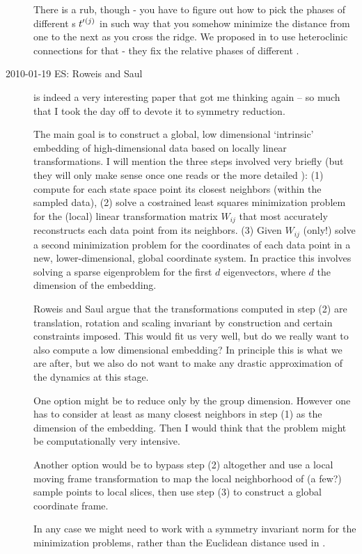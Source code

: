 \begin{description}
There is a rub, though - you have to figure out how to pick the phases of
different \template s $t'_{}{}^{(j)}$ in such way that you somehow
minimize the distance from one to the next as you cross the ridge. We
proposed in  to use heteroclinic connections for that - they
fix the relative phases of different \eqva.


 \item[2010-01-19 ES: Roweis and Saul\rf{RoSa00}] is indeed a very interesting
  paper that got me thinking again -- so much that I took the day off to devote
  it to symmetry reduction.

  The main goal is to construct a global, low dimensional `intrinsic'
  embedding of high-dimensional data based on locally linear transformations.
  I will mention the three steps involved very briefly (but they will only make
  sense once one reads  or the more detailed ):
  (1) compute for each state space point its
  closest neighbors (within the sampled data), (2) solve a costrained
  least squares minimization problem for the (local) linear transformation
  matrix $W_{ij}$ that most accurately reconstructs each data point
  from its neighbors. (3) Given $W_{ij}$ (only!) solve a second minimization
  problem for the coordinates of each data point in a new, lower-dimensional,
  global coordinate system. In practice this involves solving a sparse
  eigenproblem for the first $d$ eigenvectors, where $d$ the dimension of
  the embedding.

  Roweis and Saul argue that the transformations computed in step (2) are
  translation, rotation and scaling invariant by construction and certain
  constraints imposed. This would fit us very well, but do we really want
  to also compute a low dimensional embedding? In principle this is what we are
  after, but we also do not want to make any drastic approximation of the
  dynamics at this stage.

  One option might be to reduce only by the group dimension.
  However one has to consider at least as many closest neighbors
  in step (1) as the dimension of the embedding. Then I would think that
  the problem might be computationally very intensive.

  Another option would be to bypass step (2) altogether and use a local
  moving frame transformation to map the local neighborhood of (a few?)
  sample points to local slices, then use step (3) to construct a global
  coordinate frame.

  In any case we might need to work with a symmetry invariant norm for the
  minimization problems, rather than the Euclidean distance used in .


\end{description}
